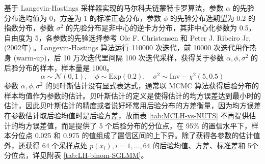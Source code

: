 \documentclass[12pt,a4paper,UTF8,twoside]{book}
\theoremstyle{definition}
\theoremstyle{definition}
\theoremstyle{definition}
\theoremstyle{remark}
\begin{document}
基于 Langevin-Hastings 采样器实现的马尔科夫链蒙特卡罗算法，参数
\(\alpha\) 的先验分布选均值为 0，方差为 1 的标准正态分布，参数 \(\phi\)
的先验分布选期望为 0.2 的指数分布，参数 \(\sigma^2\)
的先验分布是非中心的逆卡方分布，其非中心化参数为 0.5，自由度为
5，各参数的先验选择参考 Ole F. Christensen 和 Peter J. Ribeiro Jr.
(2002年) \citep{geoRglm2002}。Langevin-Hastings 算法运行 110000
次迭代，前 10000 次迭代用作热身 (warm-up)，后 10 万次迭代里间隔 100
次迭代采样，获得关于参数 \(\alpha,\phi,\sigma^2\)
的后验分布的样本，样本量是 1000。 \begin{equation}
\alpha \sim \mathcal{N}(0,1), \quad \phi \sim \mathrm{Exp}(0.2), \quad \sigma^2  \sim \mathrm{Inv-}\chi^2(5,0.5)
\end{equation} 参数 \(\alpha,\phi,\sigma^2\)
的贝叶斯估计没有显式表达式，通常以 MCMC
算法获得后验分布的样本均值作为参数的估计。贝叶斯估计的定义是使得估计的均方误差达到最小时的估计，因此贝叶斯估计的精度或者说好坏常用后验分布的方差衡量，因为均方误差在参数估计取后验均值时是后验方差，故而表
\ref{tab:MCLH-vs-NUTS} 不再提供估计的均方误差值，而是提供了 5
个后验分布的分位点，在 95\% 的置信水平下，样本分位点 0.025 和 0.975
的值组成了置信区间的上下界。除了获得各参数的估计值外，还获得 64
个采样点处 \(p(x_i), i = 1, \ldots, 64\) 的后验均值、方差、标准差和
5个分位点，详见附表 \ref{tab:LH-binom-SGLMM}。
\end{document}
